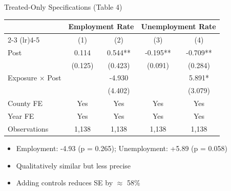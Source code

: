 \documentclass[aspectratio=169]{beamer}
\begin{document}
\begin{frame}{Treated-Only Specifications (Table 4)}
  \begin{table}
  \tiny
  \centering
  \begin{tabular}{lcccc}
  \toprule
  & \multicolumn{2}{c}{Employment Rate} & \multicolumn{2}{c}{Unemployment Rate} \\
  \cmidrule(lr){2-3} \cmidrule(lr){4-5}
  & (1) & (2) & (3) & (4) \\
  \midrule
  Post & 0.114 & 0.544** & -0.195** & -0.709** \\
  & (0.125) & (0.423) & (0.091) & (0.284) \\
  Exposure $\times$ Post & & -4.930 & & 5.891* \\
  & & (4.402) & & (3.079) \\
  \midrule
  County FE & Yes & Yes & Yes & Yes \\
  Year FE & Yes & Yes & Yes & Yes \\
  Observations & 1,138 & 1,138 & 1,138 & 1,138 \\
  \bottomrule
  \end{tabular}
  \end{table}
  \vspace{0.2cm}
  \begin{itemize}
    \item Employment: -4.93 (p = 0.265); Unemployment: +5.89 (p = 0.058)
    \item Qualitatively similar but less precise
    \item Adding controls reduces SE by $\approx$ 58\%
  \end{itemize}
\end{frame}
\end{document}
